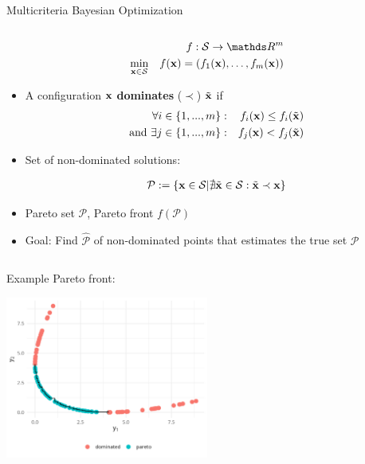 \documentclass[11pt,compress,t,notes=noshow, xcolor=table]{beamer}
\begin{document}
\begin{vbframe}{Multicriteria Bayesian Optimization}
\begin{columns}
\begin{column}{0.60\textwidth}
\begin{eqnarray*}
  && f: \mathcal{S} \rightarrow \R^m\\
  \min \limits_{\xv \in \mathcal{S}} && f(\xv) = \left(f_1(\xv), \ldots, f_m(\xv)\right)
\end{eqnarray*}
\begin{itemize}
  \item A configuration $\mathbf{x}$ \textbf{dominates} ($\prec$) $\tilde{\mathbf{x}}$ if
\begin{eqnarray*}
  \forall i \in \{ 1, ..., m\}: && f_i(\mathbf{x}) \leq f_i(\tilde{\mathbf{x}})\\
  \text{and}~\exists j \in \{1, ..., m\}: && f_j(\mathbf{x}) < f_j(\tilde{\mathbf{x}})
\end{eqnarray*}
\item Set of non-dominated solutions:
  \begin{small}
  \begin{align*}
    \mathcal{P} := \{\mathbf{x} \in \mathcal{S} | \nexists \tilde{\mathbf{x}} \in \mathcal{S}: \tilde{\mathbf{x}} \prec \mathbf{x} \}
\end{align*}
\end{small}
\item Pareto set $\mathcal{P}$, Pareto front $ f(\mathcal{P})$
\item{Goal:} Find $\hat{\mathcal{P}}$ of non-dominated points that estimates the true set $\mathcal{P}$
\end{itemize}
\end{column}
\end{columns}

\framebreak

Example Pareto front:

\vspace{+0.45cm}
\begin{center}
  \includegraphics[width = 0.5\textwidth]{figure_man/multicrit_0.png}
\end{center}
\end{vbframe}
\end{document}
